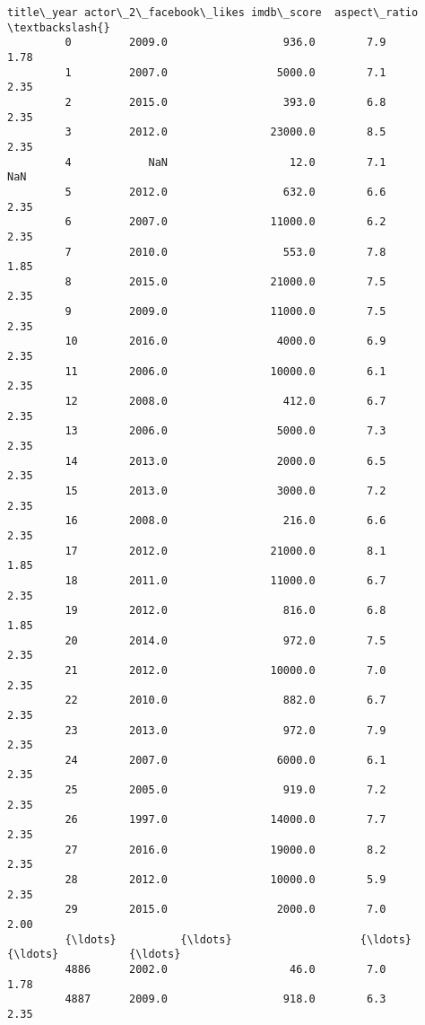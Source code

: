 \documentclass[11pt]{article}
\begin{document}
\begin{Verbatim}[commandchars=\\\{\}]
               title\_year actor\_2\_facebook\_likes imdb\_score  aspect\_ratio  \textbackslash{}
         0         2009.0                  936.0        7.9          1.78   
         1         2007.0                 5000.0        7.1          2.35   
         2         2015.0                  393.0        6.8          2.35   
         3         2012.0                23000.0        8.5          2.35   
         4            NaN                   12.0        7.1           NaN   
         5         2012.0                  632.0        6.6          2.35   
         6         2007.0                11000.0        6.2          2.35   
         7         2010.0                  553.0        7.8          1.85   
         8         2015.0                21000.0        7.5          2.35   
         9         2009.0                11000.0        7.5          2.35   
         10        2016.0                 4000.0        6.9          2.35   
         11        2006.0                10000.0        6.1          2.35   
         12        2008.0                  412.0        6.7          2.35   
         13        2006.0                 5000.0        7.3          2.35   
         14        2013.0                 2000.0        6.5          2.35   
         15        2013.0                 3000.0        7.2          2.35   
         16        2008.0                  216.0        6.6          2.35   
         17        2012.0                21000.0        8.1          1.85   
         18        2011.0                11000.0        6.7          2.35   
         19        2012.0                  816.0        6.8          1.85   
         20        2014.0                  972.0        7.5          2.35   
         21        2012.0                10000.0        7.0          2.35   
         22        2010.0                  882.0        6.7          2.35   
         23        2013.0                  972.0        7.9          2.35   
         24        2007.0                 6000.0        6.1          2.35   
         25        2005.0                  919.0        7.2          2.35   
         26        1997.0                14000.0        7.7          2.35   
         27        2016.0                19000.0        8.2          2.35   
         28        2012.0                10000.0        5.9          2.35   
         29        2015.0                 2000.0        7.0          2.00   
         {\ldots}          {\ldots}                    {\ldots}        {\ldots}           {\ldots}   
         4886      2002.0                   46.0        7.0          1.78   
         4887      2009.0                  918.0        6.3          2.35   

\end{Verbatim}
\end{document}
